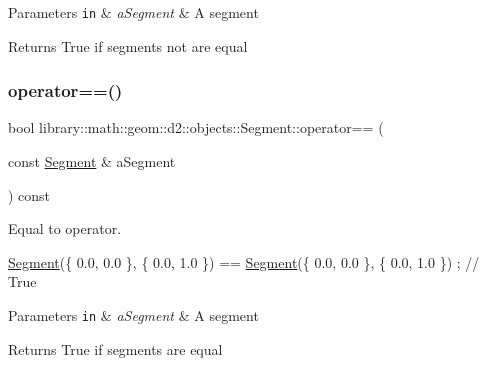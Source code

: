 \begin{DoxyParams}[1]{Parameters}
\mbox{\tt in}  & {\em a\+Segment} & A segment \\
\hline
\end{DoxyParams}
\begin{DoxyReturn}{Returns}
True if segments not are equal 
\end{DoxyReturn}
\mbox{\label{classlibrary_1_1math_1_1geom_1_1d2_1_1objects_1_1_segment_a639981918aaa52807452451b19dbf680}} 
\subsubsection{\texorpdfstring{operator==()}{operator==()}}
{\footnotesize\ttfamily bool library\+::math\+::geom\+::d2\+::objects\+::\+Segment\+::operator== (\begin{DoxyParamCaption}\item[{const \hyperlink{classlibrary_1_1math_1_1geom_1_1d2_1_1objects_1_1_segment}{Segment} \&}]{a\+Segment }\end{DoxyParamCaption}) const}



Equal to operator. 


\begin{DoxyCode}
\hyperlink{classlibrary_1_1math_1_1geom_1_1d2_1_1objects_1_1_segment_a44ba44fd5f02a02fe34c40223b38fa8f}{Segment}(\{ 0.0, 0.0 \}, \{ 0.0, 1.0 \}) == \hyperlink{classlibrary_1_1math_1_1geom_1_1d2_1_1objects_1_1_segment_a44ba44fd5f02a02fe34c40223b38fa8f}{Segment}(\{ 0.0, 0.0 \}, \{ 0.0, 1.0 \}) ; \textcolor{comment}{// True}
\end{DoxyCode}



\begin{DoxyParams}[1]{Parameters}
\mbox{\tt in}  & {\em a\+Segment} & A segment \\
\hline
\end{DoxyParams}
\begin{DoxyReturn}{Returns}
True if segments are equal 
\end{DoxyReturn}
\mbox{\label{classlibrary_1_1math_1_1geom_1_1d2_1_1objects_1_1_segment_abfe0b4983dcb9e26848d29a9b86d4b9c}} 
